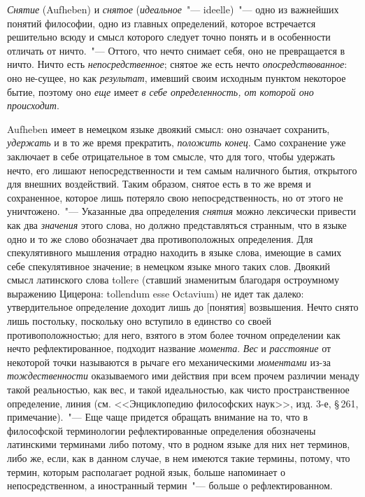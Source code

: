 \emph{Снятие} (Aufheben) и \emph{снятое} (\emph{идеальное}~"--- ideelle)~"---
одно из важнейших понятий философии, одно из главных
определений, которое встречается решительно всюду и
смысл которого следует точно понять и в особенности отличать
от ничто.~"--- Оттого, что нечто снимает себя, оно
не превращается в ничто. Ничто есть \emph{непосредственное};
снятое же есть нечто \emph{опосредствованное}: оно не-сущее, но
как \emph{результат}, имевший своим исходным пунктом некоторое
бытие, поэтому оно \emph{еще} имеет \emph{в себе определенность,
от которой оно происходит}.

Aufheben имеет в немецком языке двоякий смысл: оно
означает сохранить, \emph{удержать} и в то же время прекратить,
\emph{положить конец}. Само сохранение уже заключает в
себе отрицательное в том смысле, что для того, чтобы
удержать нечто, его лишают непосредственности и тем самым
наличного бытия, открытого для внешних воздействий.
Таким образом, снятое есть в то же время и сохраненное,
которое лишь потеряло свою непосредственность,
но от этого не уничтожено.~"--- Указанные два определения
\emph{снятия} можно лексически привести как два \emph{значения}
этого слова, но должно представляться странным, что в
языке одно и то же слово обозначает два противоположных
определения. Для спекулятивного мышления отрадно
находить в языке слова, имеющие в самих себе спекулятивное
значение; в немецком языке много таких слов.
Двоякий смысл латинского слова tollere (ставший знаменитым
благодаря остроумному выражению Цицерона:
tollendum esse Octavium)
не идет так далеко: утвердительное
определение доходит лишь до [понятия] возвышения.
Нечто снято лишь постольку, поскольку оно вступило
в единство со своей противоположностью; для него,
взятого в этом более точном определении как нечто рефлектированное,
подходит название \emph{момента}. \emph{Вес} и \emph{расстояние}
от некоторой точки называются в рычаге его механическими
\emph{моментами} из-за \emph{тождественности} оказываемого
ими действия при всем прочем различии менаду
такой реальностью, как вес, и такой идеальностью, как чисто
пространственное определение, линия (см. <<Энциклопедию
философских наук>>, изд. 3-е, \S\,261, примечание).~"---
Еще чаще придется обращать внимание на то, что в
философской терминологии рефлектированные определения
обозначены латинскими терминами
либо потому,
что в родном языке для них нет терминов, либо же, если,
как в данном случае, в нем имеются такие термины, потому,
что термин, которым располагает родной язык,
больше напоминает о непосредственном, а иностранный
термин~"--- больше о рефлектированном.

